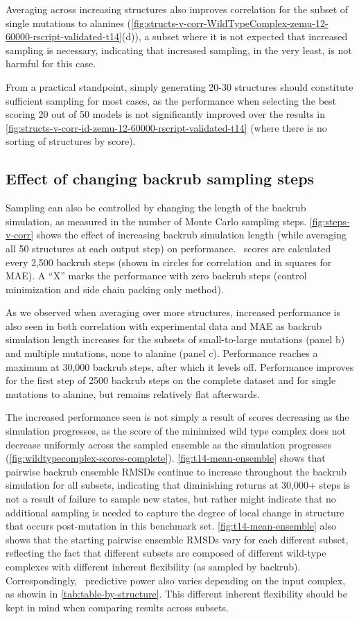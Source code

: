 Averaging across increasing structures also improves correlation for the subset of single mutations to alanines (\cref{fig:structs-v-corr-WildTypeComplex-zemu-12-60000-rscript-validated-t14}(d)), a subset where it is not expected that increased sampling is necessary, indicating that increased sampling, in the very least, is not harmful for this case.

From a practical standpoint, simply generating 20-30 structures should constitute sufficient sampling for most cases, as the performance when selecting the best scoring 20 out of 50 models is not significantly improved over the results in \cref{fig:structs-v-corr-id-zemu-12-60000-rscript-validated-t14} (where there is no sorting of structures by score).

\subsection{Effect of changing backrub sampling steps}

Sampling can also be controlled by changing the length of the backrub simulation, as measured in the number of Monte Carlo sampling steps.
\cref{fig:steps-v-corr} shows the effect of increasing backrub simulation length (while averaging all 50 structures at each output step) on performance.
\ddg\ scores are calculated every 2,500 backrub steps (shown in circles for correlation and in squares for MAE).
A ``X'' marks the performance with zero backrub steps (control minimization and side chain packing only method).

As we observed when averaging over more structures, increased performance is also seen in both correlation with experimental data and MAE as backrub simulation length increases for the subsets of small-to-large mutations (panel b) and multiple mutations, none to alanine (panel c).
Performance reaches a maximum at 30,000 backrub steps, after which it levels off.
Performance improves for the first step of 2500 backrub steps on the complete dataset and for single mutations to alanine, but remains relatively flat afterwards.

The increased performance seen is not simply a result of scores decreasing as the simulation progresses, as the score of the minimized wild type complex does not decrease uniformly across the sampled ensemble as the simulation progresses (\cref{fig:wildtypecomplex-scores-complete}).
\cref{fig:t14-mean-ensemble} shows that pairwise backrub ensemble RMSDs continue to increase throughout the backrub simulation for all subsets, indicating that diminishing returns at 30,000+ steps is not a result of failure to sample new states, but rather might indicate that no additional sampling is needed to capture the degree of local change in structure that occurs post-mutation in this benchmark set.
\cref{fig:t14-mean-ensemble} also shows that the starting pairwise ensemble RMSDs vary for each different subset, reflecting the fact that different subsets are composed of different wild-type complexes with different inherent flexibility (as sampled by backrub).
Correspondingly, \ddg\ predictive power also varies depending on the input complex, as showin in \cref{tab:table-by-structure}.
This different inherent flexibility should be kept in mind when comparing results across subsets.


